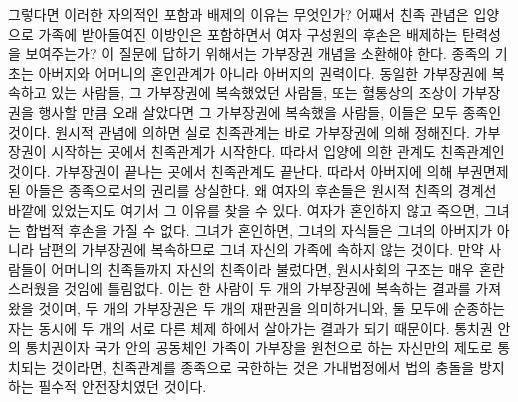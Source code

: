 그렇다면 이러한 자의적인 포함과 배제의 이유는 무엇인가?
어째서 친족 관념은 입양으로 가족에 받아들여진 이방인은 포함하면서
여자 구성원의 후손은 배제하는 탄력성을 보여주는가?
이 질문에 답하기 위해서는 가부장권 개념을 소환해야 한다.
종족의 기초는 아버지와 어머니의 혼인관계가 아니라 아버지의 권력이다.
동일한 가부장권에 복속하고 있는 사람들,
그 가부장권에 복속했었던 사람들, 또는
혈통상의 조상이 가부장권을 행사할 만큼 오래 살았다면 그 가부장권에
복속했을 사람들, 이들은 모두 종족인 것이다.
원시적 관념에 의하면 실로 친족관계는 바로 가부장권에 의해 정해진다.
가부장권이 시작하는 곳에서 친족관계가 시작한다.
따라서 입양에 의한 관계도 친족관계인 것이다.
가부장권이 끝나는 곳에서 친족관계도 끝난다.
따라서 아버지에 의해 부권면제된 아들은 종족으로서의 권리를 상실한다.
왜 여자의 후손들은 원시적 친족의 경계선 바깥에 있었는지도
여기서 그 이유를 찾을 수 있다.
여자가 혼인하지 않고 죽으면, 그녀는 합법적 후손을 가질 수 없다.
그녀가 혼인하면, 그녀의 자식들은 그녀의 아버지가 아니라 남편의 가부장권에
복속하므로 그녀 자신의 가족에 속하지 않는 것이다.
만약 사람들이 어머니의 친족들까지 자신의 친족이라 불렀다면,
원시사회의 구조는 매우 혼란스러웠을 것임에 틀림없다.
이는 한 사람이 두 개의 가부장권에 복속하는 결과를 가져왔을 것이며,
두 개의 가부장권은 두 개의 재판권을 의미하거니와,
둘 모두에 순종하는 자는 동시에 두 개의 서로 다른 체제 하에서 살아가는 결과가
되기 때문이다.
통치권 안의 통치권이자
국가 안의 공동체인 가족이
가부장을 원천으로 하는 자신만의 제도로 통치되는 것이라면,
친족관계를 종족으로 국한하는 것은
가내법정에서 법의 충돌을 방지하는
필수적 안전장치였던 것이다.

